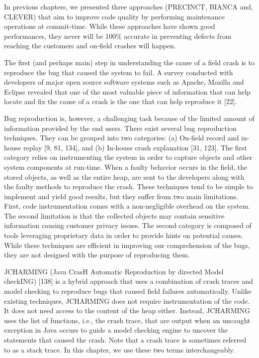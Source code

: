 \documentclass[12pt]{report}
\begin{document}
In previous chapters, we presented three approaches (PRECINCT, BIANCA
and, CLEVER) that aim to improve code quality by performing maintenance
operations at commit-time. While these approaches have shown good
performances, they never will be 100\% accurate in preventing defects
from reaching the customers and on-field crashes will happen.

The first (and perhaps main) step in understanding the cause of a field
crash is to reproduce the bug that caused the system to fail. A survey
conducted with developers of major open source software systems such as
Apache, Mozilla and Eclipse revealed that one of the most valuable piece
of information that can help locate and fix the cause of a crash is the
one that can help reproduce it {[}22{]}.

Bug reproduction is, however, a challenging task because of the limited
amount of information provided by the end users. There exist several bug
reproduction techniques. They can be grouped into two categories: (a)
On-field record and in-house replay {[}9, 81, 134{]}, and (b) In-house
crash explanation {[}31, 123{]}. The first category relies on
instrumenting the system in order to capture objects and other system
components at run-time. When a faulty behavior occurs in the field, the
stored objects, as well as the entire heap, are sent to the developers
along with the faulty methods to reproduce the crash. These techniques
tend to be simple to implement and yield good results, but they suffer
from two main limitations. First, code instrumentation comes with a
non-negligible overhead on the system. The second limitation is that the
collected objects may contain sensitive information causing customer
privacy issues. The second category is composed of tools leveraging
proprietary data in order to provide hints on potential causes. While
these techniques are efficient in improving our comprehension of the
bugs, they are not designed with the purpose of reproducing them.

JCHARMING (Java CrasH Automatic Reproduction by directed Model checkING)
{[}138{]} is a hybrid approach that uses a combination of crash traces
and model checking to reproduce bugs that caused field failures
automatically. Unlike existing techniques, JCHARMING does not require
instrumentation of the code. It does not need access to the content of
the heap either. Instead, JCHARMING uses the list of functions, i.e.,
the crash trace, that are output when an uncaught exception in Java
occurs to guide a model checking engine to uncover the statements that
caused the crash. Note that a crash trace is sometimes referred to as a
stack trace. In this chapter, we use these two terms interchangeably.
\end{document}
